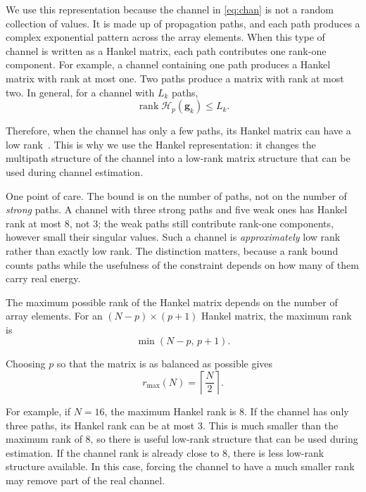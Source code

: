 \documentclass[journal]{IEEEtran}
\DeclareMathOperator{\rank}{rank}
\newcommand{\bg}{\mathbf{g}}
\newcommand{\Hank}{\mathcal{H}}
\newcommand{\rmax}{r_{\mathrm{max}}}
\begin{document}
We use this representation because the channel in \eqref{eq:chan} is not a
random collection of values. It is made up of propagation paths, and each path
produces a complex exponential pattern across the array elements. When this
type of channel is written as a Hankel matrix, each path contributes one
rank-one component. For example, a channel containing one path produces a
Hankel matrix with rank at most one. Two paths produce a matrix with rank at
most two. In general, for a channel with $L_k$ paths,
\begin{equation}
\rank\Hank_p(\bg_k)\le L_k.
\end{equation}

Therefore, when the channel has only a few paths, its Hankel matrix can have a
low rank~\cite{cadzow1988,markovsky2008}. This is why we use the Hankel
representation: it changes the multipath structure of the channel into a
low-rank matrix structure that can be used during channel estimation.

One point of care. The bound is on the number of paths, not on the number of
\emph{strong} paths. A channel with three strong paths and five weak ones has
Hankel rank at most 8, not 3; the weak paths still contribute rank-one
components, however small their singular values. Such a channel is
\emph{approximately} low rank rather than exactly low rank. The distinction
matters, because a rank bound counts paths while the usefulness of the
constraint depends on how many of them carry real energy.

The maximum possible rank of the Hankel matrix depends on the number of array
elements. For an $(N-p)\times(p+1)$ Hankel matrix, the maximum rank is
\begin{equation}
\min(N-p,\,p+1).
\end{equation}

Choosing $p$ so that the matrix is as balanced as possible gives
\begin{equation}
\rmax(N)=\left\lceil\frac{N}{2}\right\rceil.
\label{eq:rmax}
\end{equation}

For example, if $N=16$, the maximum Hankel rank is 8. If the channel has only
three paths, its Hankel rank can be at most 3. This is much smaller
than the maximum rank of 8, so there is useful low-rank structure that can be
used during estimation. If the channel rank is already close to 8, there is
less low-rank structure available. In this case, forcing the channel to have a
much smaller rank may remove part of the real channel.
\end{document}
